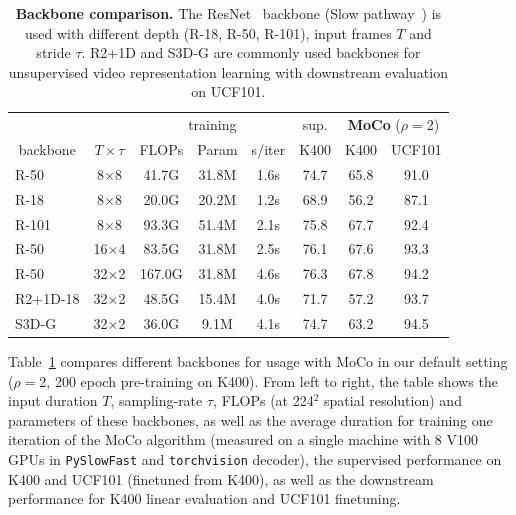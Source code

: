 \documentclass[final]{cvpr}
\newcommand{\tblref}[1]{Table~\ref{#1}}
\def\x{$\times$}
\newcommand{\tablestyle}[2]{\setlength{\tabcolsep}{#1}\renewcommand{\arraystretch}{#2}\centering\footnotesize}
\begin{document}
	\begin{table}[h!] 
		\centering
		\tablestyle{3.2pt}{1.1} 
		\begin{tabular}{l|c|ccc|c|cc}
			& &\multicolumn{3}{c|}{training}   &  \multicolumn{1}{c|}{sup.} & \multicolumn{2}{c}{\textbf{MoCo} ($\rho{=}$2)}    \\
			\multicolumn{1}{c|}{ backbone } & ${T \times \tau}$  & FLOPs & Param & s/iter & K400 & K400 &UCF101 \\
			\shline
			R-50   &8\x8  & 41.7G & 31.8M & 1.6s & 74.7  & 65.8 &  91.0  \\ \hline %
			R-18   &8\x8  &  20.0G  & 20.2M & 1.2s & 68.9  & 56.2 & 87.1 \\   %
			R-101   &8\x8  & 93.3G & 51.4M & 2.1s &  75.8  & 67.7 & 92.4 \\ \hline %
			
			R-50   & 16\x4  & 83.5G & 31.8M & 2.5s  & 76.1  & 67.6 & 93.3 \\ %
			R-50   & 32\x2  & 167.0G & 31.8M &4.6s & 76.3 & 67.8 & 94.2 \\ \hline %
			
			R2+1D-18 & 32\x2  & 48.5G &15.4M & 4.0s & 71.7 & 57.2 &  93.7 \\  %
			
			S3D-G  & 32\x2  & 36.0G & 9.1M & 4.1s & 74.7  & 63.2  &  94.5 \\  %
		\end{tabular}
		\caption{\textbf{Backbone comparison.} The ResNet~\cite{He16} backbone (Slow pathway~\cite{Feichtenhofer19}) is used with different depth (R-18, R-50, R-101), input frames $T$ and stride $\tau$. R2+1D \cite{Tran18} and S3D-G \cite{Xie18s3d} are commonly used backbones for unsupervised video representation learning with downstream evaluation on UCF101. }
		\label{tab:architectures}
	\end{table}
	
	\tblref{tab:architectures} compares different backbones for usage with MoCo in our default setting ($\rho{=}$2, 200 epoch pre-training on K400). From left to right, the table shows the input duration $T$, sampling-rate $\tau$, FLOPs (at 224$^2$ spatial resolution) and parameters of these backbones, as well as the average duration for training one iteration of the MoCo algorithm (measured on a single machine with 8 V100 GPUs in \texttt{PySlowFast} \cite{fan2020pyslowfast} and \texttt{torchvision} decoder), the supervised performance on K400 and UCF101 (finetuned from K400), as well as the downstream performance for K400 linear evaluation and UCF101 finetuning. 
	
\end{document}
